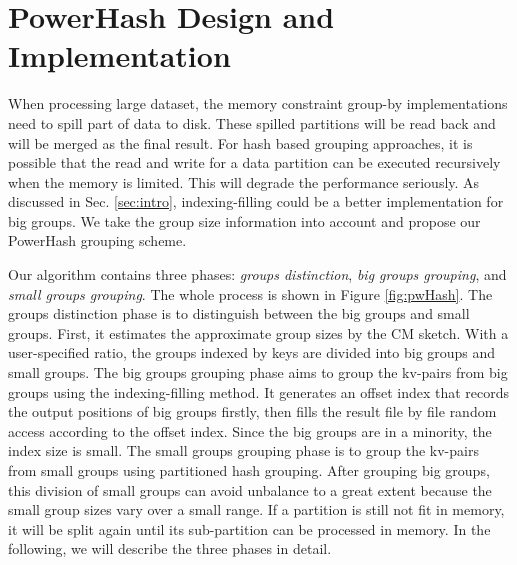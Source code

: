 \section{PowerHash Design and Implementation}
\label{sec:hash}

When processing large dataset, the memory constraint group-by implementations need to spill part of data to disk. These spilled partitions will be read back and will be merged as the final result. For hash based grouping approaches, it is possible that the read and write for a data partition can be executed recursively when the memory is limited. This will degrade the performance seriously. As discussed in Sec. \ref{sec:intro}, indexing-filling could be a better implementation for big groups. We take the group size information into account and propose our PowerHash grouping scheme.




Our algorithm contains three phases: \emph{groups distinction}, \emph{big groups grouping}, and \emph{small groups grouping}. The whole process is shown in Figure \ref{fig:pwHash}. The groups distinction phase is to distinguish between the big groups and small groups. First, it estimates the approximate group sizes by the CM sketch. With a user-specified ratio, the groups indexed by keys are divided into big groups and small groups. The big groups grouping phase aims to group the kv-pairs from big groups using the indexing-filling method. It generates an offset index that records the output positions of big groups firstly, then fills the result file by file random access according to the offset index. Since the big groups are in a minority, the index size is small. The small groups grouping phase is to group the kv-pairs from small groups using partitioned hash grouping. After grouping big groups, this division of small groups can avoid unbalance to a great extent because the small group sizes vary over a small range. If a partition is still not fit in memory, it will be split again until its sub-partition can be processed in memory. In the following, we will describe the three phases in detail.

